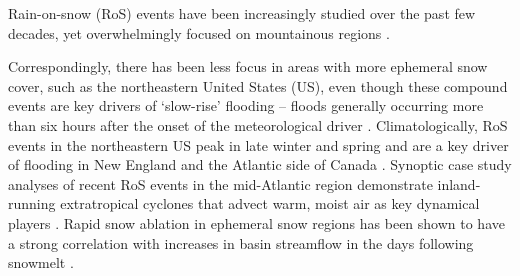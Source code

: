 \documentclass[nhess, manuscript]{copernicus}
\begin{document}

%
%
%
%


\introduction

Rain-on-snow (RoS) events have been increasingly studied over the past few decades, yet overwhelmingly focused on mountainous regions \citep{singh1997hydrological,mccabe2007rain,wayand2015modeling,sterle2019hydroclimate,musselman2018projected,poschlod2020climate,siirila2021a,heggli2022toward,yu2022diverse,brandt2022a,maina2023diverging,haleakala2023watershed}.

Correspondingly, there has been less focus in areas with more ephemeral snow cover, such as the northeastern United States (US), even though these compound events are key drivers of `slow-rise' flooding -- floods generally occurring more than six hours after the onset of the meteorological driver \citep{dougherty2021high}.
Climatologically, RoS events in the northeastern US peak in late winter and spring \citep{ashley2008flood,villarini2010flood,dougherty2019climatology,wachowicz2020rain} and are a key driver of flooding in New England and the Atlantic side of Canada \citep{collins2014annual}.
Synoptic case study analyses of recent RoS events in the mid-Atlantic region demonstrate inland-running extratropical cyclones that advect warm, moist air as key dynamical players \citep{grote2021synoptic}.
Rapid snow ablation in ephemeral snow regions has been shown to have a strong correlation with increases in basin streamflow in the days following snowmelt \citep{suriano2020discharge}.
\end{document}
